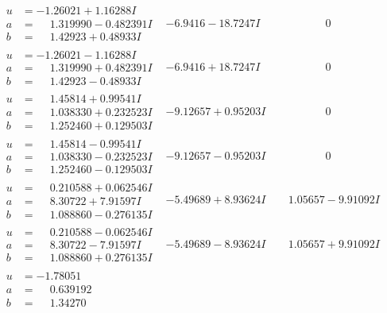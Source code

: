 \documentclass[1p]{elsarticle_modified}
\theoremstyle{definition}
\begin{document}
$$\begin{array}{c|c|c}
\begin{aligned}
u &= -1.26021 + 1.16288 I \\
a &= \phantom{-}1.319990 - 0.482391 I \\
b &= \phantom{-}1.42923 + 0.48933 I\end{aligned}
 & -6.9416 - 18.7247 I & \phantom{-0.000000 } 0 \\ \hline\begin{aligned}
u &= -1.26021 - 1.16288 I \\
a &= \phantom{-}1.319990 + 0.482391 I \\
b &= \phantom{-}1.42923 - 0.48933 I\end{aligned}
 & -6.9416 + 18.7247 I & \phantom{-0.000000 } 0 \\ \hline\begin{aligned}
u &= \phantom{-}1.45814 + 0.99541 I \\
a &= \phantom{-}1.038330 + 0.232523 I \\
b &= \phantom{-}1.252460 + 0.129503 I\end{aligned}
 & -9.12657 + 0.95203 I & \phantom{-0.000000 } 0 \\ \hline\begin{aligned}
u &= \phantom{-}1.45814 - 0.99541 I \\
a &= \phantom{-}1.038330 - 0.232523 I \\
b &= \phantom{-}1.252460 - 0.129503 I\end{aligned}
 & -9.12657 - 0.95203 I & \phantom{-0.000000 } 0 \\ \hline\begin{aligned}
u &= \phantom{-}0.210588 + 0.062546 I \\
a &= \phantom{-}8.30722 + 7.91597 I \\
b &= \phantom{-}1.088860 - 0.276135 I\end{aligned}
 & -5.49689 + 8.93624 I & \phantom{-}1.05657 - 9.91092 I \\ \hline\begin{aligned}
u &= \phantom{-}0.210588 - 0.062546 I \\
a &= \phantom{-}8.30722 - 7.91597 I \\
b &= \phantom{-}1.088860 + 0.276135 I\end{aligned}
 & -5.49689 - 8.93624 I & \phantom{-}1.05657 + 9.91092 I \\ \hline\begin{aligned}
u &= -1.78051\phantom{ +0.000000I} \\
a &= \phantom{-}0.639192\phantom{ +0.000000I} \\
b &= \phantom{-}1.34270\phantom{ +0.000000I}\end{aligned}

\end{array}$$
\end{document}
